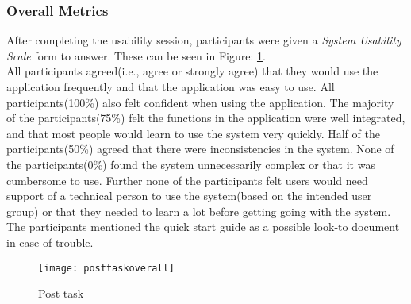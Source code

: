 \subsubsection{Overall Metrics}
After completing the usability session, participants were given a \emph{System Usability Scale} form to answer\citep{brooke1996sus}. These can be seen in Figure: \ref{posttaskoverall}. \\

All participants agreed(i.e., agree or strongly agree) that they would use the application frequently and that the application was easy to use. All participants(100\%) also felt confident when using the application. The majority of the participants(75\%) felt the functions in the application were well integrated, and that most people would learn to use the system very quickly. Half of the participants(50\%) agreed that there were inconsistencies in the system. None of the participants(0\%) found the system unnecessarily complex or that it was cumbersome to use. Further none of the participants felt users would need support of a technical person to use the system(based on the intended user group) or that they needed to learn a lot before getting going with the system. The participants mentioned the quick start guide as a possible look-to document in case of trouble.  
\begin{figure}[h!]
    \centering
        \texttt{[image: posttaskoverall]}
    \caption{Post task}
    \label{posttaskoverall}
\end{figure}

